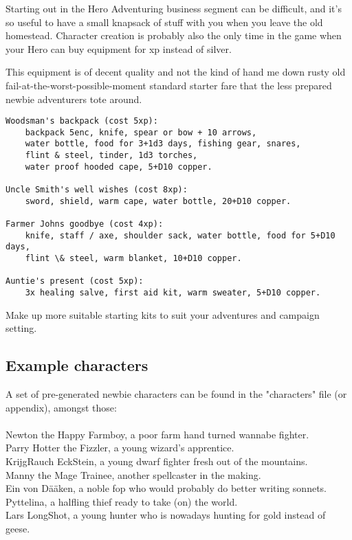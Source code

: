 Starting out in the Hero Adventuring business segment can be difficult, and it's so useful to have a small knapsack of stuff with you when you leave the old homestead. Character creation is probably also the only time in the game when your Hero can buy equipment for xp instead of silver.

This equipment is of decent quality and not the kind of hand me down rusty old fail-at-the-worst-possible-moment standard starter fare that the less prepared newbie adventurers tote around.

\small\begin{verbatim}
Woodsman's backpack (cost 5xp):
    backpack 5enc, knife, spear or bow + 10 arrows,
    water bottle, food for 3+1d3 days, fishing gear, snares,
    flint & steel, tinder, 1d3 torches,
    water proof hooded cape, 5+D10 copper.

Uncle Smith's well wishes (cost 8xp):
    sword, shield, warm cape, water bottle, 20+D10 copper.

Farmer Johns goodbye (cost 4xp):
    knife, staff / axe, shoulder sack, water bottle, food for 5+D10 days,
    flint \& steel, warm blanket, 10+D10 copper.

Auntie's present (cost 5xp):
    3x healing salve, first aid kit, warm sweater, 5+D10 copper.
\end{verbatim} \normalsize

Make up more suitable starting kits to suit your adventures and campaign setting.







\subsection*{Example characters}

A set of pre-generated newbie characters can be found in the "characters" file (or appendix), amongst those: \\
 \\
Newton the Happy Farmboy, a poor farm hand turned wannabe fighter. \\
Parry Hotter the Fizzler, a young wizard's apprentice. \\
KrijgRauch EckStein, a young dwarf fighter fresh out of the mountains. \\
Manny the Mage Trainee, another spellcaster in the making. \\
Ein von Dääken, a noble fop who would probably do better writing sonnets. \\
Pyttelina, a halfling thief ready to take (on) the world. \\
Lars LongShot, a young hunter who is nowadays hunting for gold instead of geese. \\


